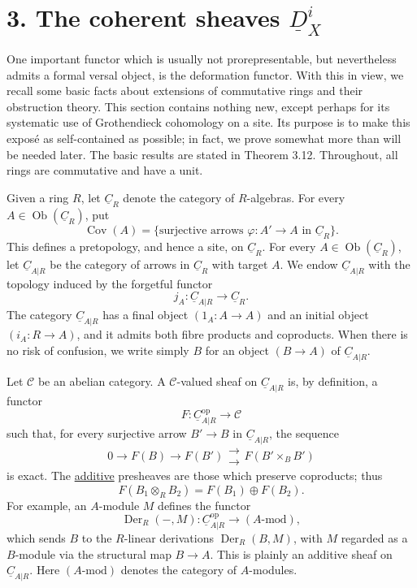
\section*{3. The coherent sheaves $\underline D_X^i$}

One important functor which is usually not prorepresentable, but
nevertheless admits a formal versal object, is the deformation
functor. With this in view, we recall some basic facts about
extensions of commutative rings and their obstruction theory. This
section contains nothing new, except perhaps for its systematic use
of Grothendieck cohomology on a site. Its purpose is to make this
expos\'e as self-contained as possible; in fact, we prove somewhat
more than will be needed later. The basic results are stated in
Theorem 3.12. Throughout, all rings are commutative and have a unit.


Given a ring $R$, let $\underline C_R$ denote the category of
$R$-algebras. For every $A\in\operatorname{Ob}(\underline C_R)$, put
\[
 \operatorname{Cov}(A)=
 \{\text{surjective arrows }\varphi:A'\longrightarrow A
   \text{ in }\underline C_R\}.
\]
This defines a pretopology, and hence a site, on $\underline C_R$.
For every $A\in\operatorname{Ob}(\underline C_R)$, let
$\underline C_{A|R}$ be the category of arrows in $\underline C_R$
with target $A$. We endow $\underline C_{A|R}$ with the topology
induced by the forgetful functor
\[
 j_A:\underline C_{A|R}\longrightarrow\underline C_R.
\]
The category $\underline C_{A|R}$ has a final object
$(1_A:A\longrightarrow A)$ and an initial object
$(i_A:R\longrightarrow A)$, and it admits both fibre products and
coproducts. When there is no risk of confusion, we write simply $B$
for an object $(B\longrightarrow A)$ of $\underline C_{A|R}$.

Let $\mathscr C$ be an abelian category. A $\mathscr C$-valued sheaf
on $\underline C_{A|R}$ is, by definition, a functor
\[
 F:\underline C_{A|R}^{\mathrm{op}}\longrightarrow\mathscr C
\]
such that, for every surjective arrow $B'\longrightarrow B$ in
$\underline C_{A|R}$, the sequence
\[
 0\longrightarrow F(B)\longrightarrow F(B')
 \mathrel{\substack{\longrightarrow\\[-.6ex]\longrightarrow}}
 F(B'\mathbin{\times_B}B')
\]
is exact. The \underline{additive} presheaves are those which
preserve coproducts; thus
\[
 F(B_1\otimes_R B_2)=F(B_1)\oplus F(B_2).
\]
For example, an $A$-module $M$ defines the functor
\[
 \operatorname{Der}_R(-,M):
 \underline C_{A|R}^{\mathrm{op}}\longrightarrow(A\text{-mod}),
\]
which sends $B$ to the $R$-linear derivations
$\operatorname{Der}_R(B,M)$, with $M$ regarded as a $B$-module via
the structural map $B\longrightarrow A$. This is plainly an
additive sheaf on $\underline C_{A|R}$. Here $(A\text{-mod})$ denotes
the category of $A$-modules.

